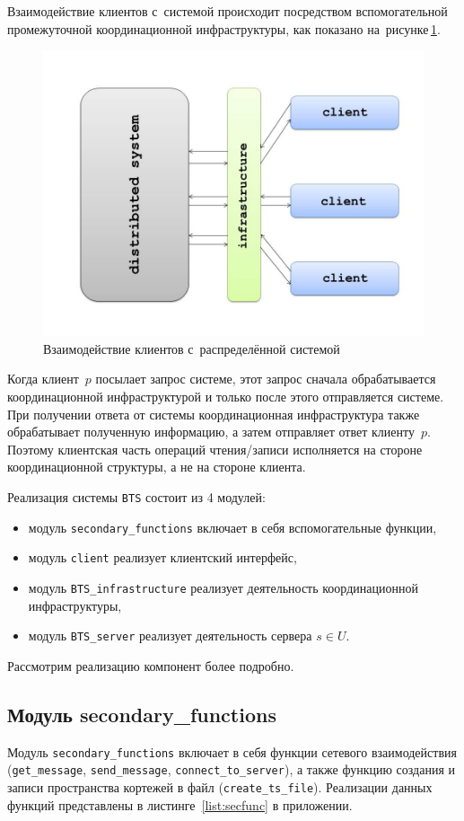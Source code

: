 Взаимодействие клиентов с~системой происходит посредством вспомогательной промежуточной координационной инфраструктуры, как показано на~рисунке\,\ref{clser}.
\begin{figure}[H]
	\centering \includegraphics[width=0.7 \textwidth, height=0.5 \textwidth]{img/ClientServer}  \caption{Взаимодействие клиентов с~распределённой системой} \label{clser}
\end{figure}
Когда клиент~$p$ посылает запрос системе, этот запрос сначала обрабатывается координационной инфраструктурой и только после этого отправляется системе. При получении ответа от системы координационная инфраструктура также обрабатывает полученную информацию, а затем отправляет ответ клиенту~$p$. Поэтому клиентская часть операций чтения/записи исполняется на стороне координационной структуры, а не на стороне клиента.

Реализация системы \texttt{BTS} состоит из 4 модулей:
\begin{itemize}
	\item модуль \texttt{secondary\_functions} включает в себя вспомогательные функции,
	\item модуль \texttt{client} реализует клиентский интерфейс,
	\item модуль \texttt{BTS_infrastructure} реализует деятельность координационной инфраструктуры,
	\item модуль \texttt{BTS_server} реализует деятельность сервера $s \in U$.
\end{itemize}
Рассмотрим реализацию компонент более подробно.

\subsection{Модуль secondary_functions}\label{subsec:2}
Модуль \texttt{secondary\_functions} включает в себя функции сетевого взаимодействия (\texttt{get_message}, \texttt{send_message}, \texttt{connect_to_server}), а также функцию создания и записи пространства кортежей в файл (\texttt{create_ts_file}). Реализации данных функций представлены в листинге~\ref{list:secfunc} в приложении.

